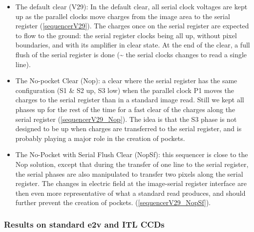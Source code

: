 \begin{itemize}
\tightlist
\item
  The default clear (V29): In the default clear, all serial clock voltages are
  kept up as the parallel clocks move charges from the image area to the
  serial register (\hyperref[sequencerV29]{{[}sequencerV29{]}}). The
  charges once on the serial register are expected to flow to the ground:
  the serial register clocks being all up, without pixel boundaries, and
  with its amplifier in clear state. At the end of the clear, a full
  flush of the serial register is done (\textasciitilde{} the serial
  clocks changes to read a single line).
\item
  The No-pocket Clear (Nop): a clear where the serial register has the
  same configuration (S1 \& S2 up, S3 low) when the parallel clock P1
  moves the charges to the serial register than in a standard image read. Still we kept all phases up for the rest of the time for a fast clear
  of the charges along the serial register
  (\hyperref[sequencerV29_Nop]{{[}sequencerV29\_Nop{]}}). The idea is
  that the S3 phase is not designed to be up when charges are transferred
  to the serial register, and is probably playing a major role in the creation of pockets.
\item
  The No-Pocket with Serial Flush Clear (NopSf): this sequencer is close
  to the Nop solution, except that during the transfer of one line to
  the serial register, the serial phases are also manipulated to transfer two
  pixels along the serial register. The changes in electric field at the
  image-serial register interface are then even more representative of
  what a standard read produces, and should further prevent the
  creation of pockets.
  (\hyperref[sequencerV29_NopSf]{{[}sequencerV29\_NopSf{]}}).
\end{itemize}

\subsubsection{Results on standard e2v and ITL CCDs}\label{results-on-standard-e2v-and-itl-ccd}

